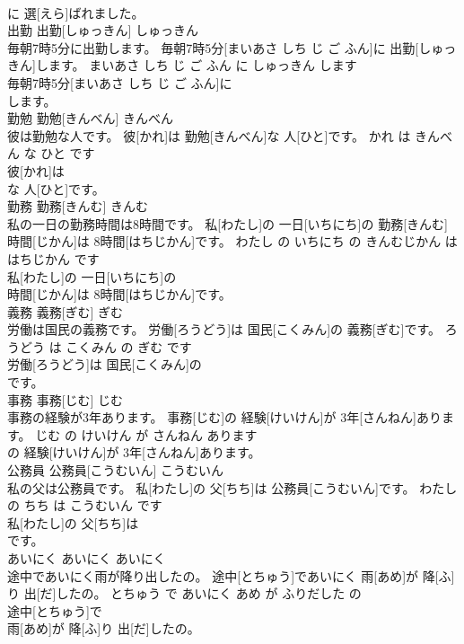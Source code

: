 \documentclass[8pt]{extreport}
\begin{document}
\begin{CJK}{UTF8}{min}
\\	に 選[えら]ばれました。			
\\	出勤	出勤[しゅっきん]	しゅっきん	
\\	毎朝7時5分に出勤します。	毎朝7時5分[まいあさ しち じ ご ふん]に 出勤[しゅっきん]します。	まいあさ しち じ ご ふん に しゅっきん します	
\\	毎朝7時5分[まいあさ しち じ ご ふん]に
\\	します。			
\\	勤勉	勤勉[きんべん]	きんべん	
\\	彼は勤勉な人です。	彼[かれ]は 勤勉[きんべん]な 人[ひと]です。	かれ は きんべん な ひと です	
\\	彼[かれ]は
\\	な 人[ひと]です。			
\\	勤務	勤務[きんむ]	きんむ	
\\	私の一日の勤務時間は8時間です。	私[わたし]の 一日[いちにち]の 勤務[きんむ] 時間[じかん]は 8時間[はちじかん]です。	わたし の いちにち の きんむじかん は はちじかん です	
\\	私[わたし]の 一日[いちにち]の
\\	時間[じかん]は 8時間[はちじかん]です。			
\\	義務	義務[ぎむ]	ぎむ	
\\	労働は国民の義務です。	労働[ろうどう]は 国民[こくみん]の 義務[ぎむ]です。	ろうどう は こくみん の ぎむ です	
\\	労働[ろうどう]は 国民[こくみん]の
\\	です。			
\\	事務	事務[じむ]	じむ	
\\	事務の経験が3年あります。	事務[じむ]の 経験[けいけん]が 3年[さんねん]あります。	じむ の けいけん が さんねん あります	
\\	の 経験[けいけん]が 3年[さんねん]あります。			
\\	公務員	公務員[こうむいん]	こうむいん	
\\	私の父は公務員です。	私[わたし]の 父[ちち]は 公務員[こうむいん]です。	わたし の ちち は こうむいん です	
\\	私[わたし]の 父[ちち]は
\\	です。			
\\	あいにく	あいにく	あいにく	
\\	途中であいにく雨が降り出したの。	途中[とちゅう]であいにく 雨[あめ]が 降[ふ]り 出[だ]したの。	とちゅう で あいにく あめ が ふりだした の	
\\	途中[とちゅう]で
\\	雨[あめ]が 降[ふ]り 出[だ]したの。			

\end{CJK}
\end{document}
